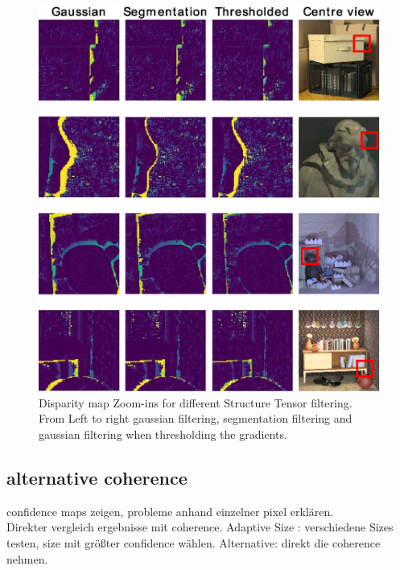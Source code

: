 \documentclass  [
  paper    = a4,
  BCOR     = 10mm,
  twoside,
  fontsize = 12pt,
  fleqn,
  toc      = bibnumbered,
  toc      = listofnumbered,
  numbers  = noendperiod,
  headings = normal,
  listof   = leveldown,
  version  = 3.03
]                                       {scrreprt}
\begin{document}
\begin{figure}
	\centering
	\includegraphics[width=1\linewidth]{images/thresh_results_morph}
	\caption[Disparity map Zoom-ins for different methods]{Disparity map Zoom-ins for different Structure Tensor filtering. From Left to right gaussian filtering, segmentation filtering and gaussian filtering when thresholding the gradients.}
	\label{fig:threshresultsmorph}
\end{figure}



\subsection{alternative coherence}
confidence maps zeigen, probleme anhand einzelner pixel erklären.\\
Direkter vergleich ergebnisse mit coherence.
Adaptive Size : verschiedene Sizes testen, size mit größter confidence wählen. Alternative: direkt die coherence nehmen. 
\end{document}
